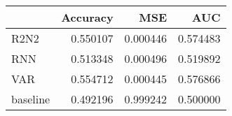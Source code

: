 \begin{tabular}{lrrr}
\toprule
{} &  Accuracy &       MSE &       AUC \\
\midrule
R2N2     &  0.550107 &  0.000446 &  0.574483 \\
RNN      &  0.513348 &  0.000496 &  0.519892 \\
VAR      &  0.554712 &  0.000445 &  0.576866 \\
baseline &  0.492196 &  0.999242 &  0.500000 \\
\bottomrule
\end{tabular}
